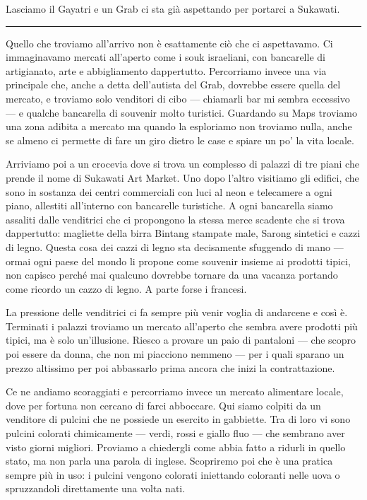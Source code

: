 Lasciamo il Gayatri e un Grab ci sta già aspettando per portarci a Sukawati.

\begin{center}
    \noindent\rule{0.6\textwidth}{0.4pt}
\end{center}

Quello che troviamo all'arrivo non è esattamente ciò che ci aspettavamo. Ci immaginavamo mercati all'aperto come i souk israeliani, con bancarelle di artigianato, arte e abbigliamento dappertutto. Percorriamo invece una via principale che, anche a detta dell'autista del Grab, dovrebbe essere quella del mercato, e troviamo solo venditori di cibo — chiamarli bar mi sembra eccessivo — e qualche bancarella di souvenir molto turistici. Guardando su Maps troviamo una zona adibita a mercato ma quando la esploriamo non troviamo nulla, anche se almeno ci permette di fare un giro dietro le case e spiare un po' la vita locale.

Arriviamo poi a un crocevia dove si trova un complesso di palazzi di tre piani che prende il nome di Sukawati Art Market. Uno dopo l'altro visitiamo gli edifici, che sono in sostanza dei centri commerciali con luci al neon e telecamere a ogni piano, allestiti all'interno con bancarelle turistiche. A ogni bancarella siamo assaliti dalle venditrici che ci propongono la stessa merce scadente che si trova dappertutto: magliette della birra Bintang stampate male, Sarong sintetici e cazzi di legno. Questa cosa dei cazzi di legno sta decisamente sfuggendo di mano — ormai ogni paese del mondo li propone come souvenir insieme ai prodotti tipici, non capisco perché mai qualcuno dovrebbe tornare da una vacanza portando come ricordo un cazzo di legno. A parte forse i francesi.

La pressione delle venditrici ci fa sempre più venir voglia di andarcene e così è. Terminati i palazzi troviamo un mercato all'aperto che sembra avere prodotti più tipici, ma è solo un'illusione. Riesco a provare un paio di pantaloni — che scopro poi essere da donna, che non mi piacciono nemmeno — per i quali sparano un prezzo altissimo per poi abbassarlo prima ancora che inizi la contrattazione.

Ce ne andiamo scoraggiati e percorriamo invece un mercato alimentare locale, dove per fortuna non cercano di farci abboccare. Qui siamo colpiti da un venditore di pulcini che ne possiede un esercito in gabbiette. Tra di loro vi sono pulcini colorati chimicamente — verdi, rossi e giallo fluo — che sembrano aver visto giorni migliori. Proviamo a chiedergli come abbia fatto a ridurli in quello stato, ma non parla una parola di inglese. Scopriremo poi che è una pratica sempre più in uso: i pulcini vengono colorati iniettando coloranti nelle uova o spruzzandoli direttamente una volta nati.

